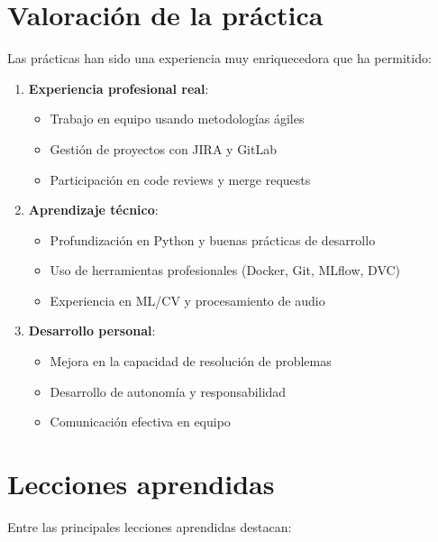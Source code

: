 \section{Valoración de la práctica}
\label{sec:valoracion}

Las prácticas han sido una experiencia muy enriquecedora que ha permitido:

\begin{enumerate}
    \item \textbf{Experiencia profesional real}:
    \begin{itemize}
        \item Trabajo en equipo usando metodologías ágiles
        \item Gestión de proyectos con JIRA y GitLab
        \item Participación en code reviews y merge requests
    \end{itemize}
    
    \item \textbf{Aprendizaje técnico}:
    \begin{itemize}
        \item Profundización en Python y buenas prácticas de desarrollo
        \item Uso de herramientas profesionales (Docker, Git, MLflow, DVC)
        \item Experiencia en ML/CV y procesamiento de audio
    \end{itemize}
    
    \item \textbf{Desarrollo personal}:
    \begin{itemize}
        \item Mejora en la capacidad de resolución de problemas
        \item Desarrollo de autonomía y responsabilidad
        \item Comunicación efectiva en equipo
    \end{itemize}
\end{enumerate}

\section{Lecciones aprendidas}
\label{sec:lecciones}

Entre las principales lecciones aprendidas destacan:

